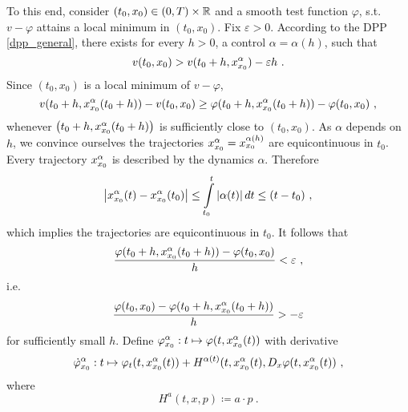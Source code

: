 \begin{example}
	To this end, consider $ (t_0, x_0) \in \left(0, T\right) \times \mathbb{R} $ and a smooth test function $ \varphi $, s.t. $ v - \varphi $ attains a local minimum in $ (t_0, x_0) $. Fix $ \varepsilon > 0 $. According to the DPP \eqref{dpp_general}, there exists for every $ h > 0 $, a control $ \alpha = \alpha(h) $, such that
	\begin{equation*}
		v(t_0, x_0) > v(t_0 + h, x_{x_0}^{\alpha}) - \varepsilon h \ .
	\end{equation*}
	Since $ (t_0, x_0) $ is a local minimum of $ v - \varphi $,
	\begin{equation*}
		v(t_0 + h, \simpleTrajectory{x_0}{\alpha}(t_0  + h)) - v(t_0, x_0) \geq \varphi(t_0 + h, \simpleTrajectory{x_0}{\alpha}(t_0  + h)) - \varphi(t_0, x_0) \ ,
	\end{equation*}
	whenever $ \left(t_0 + h, x_{x_0}^{\alpha}(t_0  + h)\right) $ is sufficiently close to $ (t_0, x_0) $. As $ \alpha $ depends on $ h $, we convince ourselves the trajectories $ x_{x_0}^{\alpha} = x_{x_0}^{\alpha(h)} $ are equicontinuous in $ t_0 $. Every trajectory $ x_{x_0}^{\alpha} $ is described by the dynamics $ \alpha $. Therefore
	\begin{equation*}
		\left\lvert {x_{x_0}^{\alpha}(t) - x_{x_0}^{\alpha}(t_0)} \right\rvert \leq \int\limits_{t_0}^{t} \left\lvert {\alpha(t)} \right\rvert dt \leq (t - t_0) \ ,
	\end{equation*}
	which implies the trajectories are equicontinuous in $ t_0 $. It follows that
	\begin{equation*}
		\frac{\varphi(t_0 + h, x_{x_0}^{\alpha}(t_0 + h)) - \varphi(t_0, x_0)}{h} < \varepsilon \ ,
	\end{equation*}
	i.e.
	\begin{equation*}
		\frac{\varphi(t_0, x_0) - \varphi(t_0 + h, x_{x_0}^{\alpha}(t_0 + h))}{h} > -\varepsilon
	\end{equation*}
	for sufficiently small $ h $. Define $ \varphi_{x_0}^{\alpha} : t \mapsto \varphi(t, x_{x_0}^{\alpha}(t)) $ with derivative
	\begin{equation*}
		\dot{\varphi}_{x_0}^{\alpha} : t \mapsto \varphi_t(t, x_{x_0}^{\alpha}(t)) + H^{\alpha(t)}(t, x_{x_0}^{\alpha}(t), D_x \varphi(t, x_{x_0}^{\alpha}(t)) \ ,
	\end{equation*}
	where
	\begin{equation*}
		H^a (t, x, p) \coloneqq a \cdot p \ .

\end{equation*}
\end{example}
